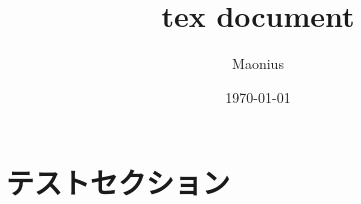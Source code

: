 \documentclass[a4paper,11pt]{jsarticle}
\title{tex document}
\author{Maonius}
\date{\today}
\begin{document}
\maketitle

\section{テストセクション}
\end{document}
